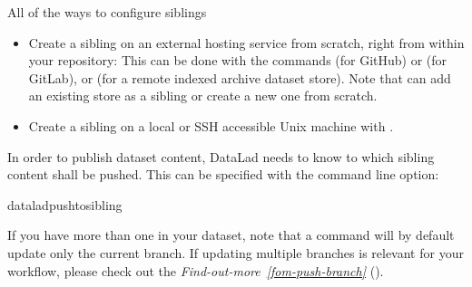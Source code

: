 \begin{findoutmore}[label={fom-all-siblings}, before title={\thetcbcounter\ }, float, floatplacement=tb, check odd page=true]{All of the ways to configure siblings}
\begin{itemize}
\item {} 
\sphinxAtStartPar
Create a sibling on an external hosting service from scratch, right from
within your repository:
This can be done with the commands  (for GitHub)
or  (for GitLab), or
 (for a remote indexed archive dataset store).
Note that  can add an existing store as a sibling
or create a new one from scratch.

\item {} 
\sphinxAtStartPar
Create a sibling on a local or SSH accessible Unix machine with
.

\end{itemize}


\end{findoutmore}

\sphinxAtStartPar
In order to publish dataset content, DataLad needs to know to which sibling
content shall be pushed. This can be specified with the  command line option:

\begin{sphinxVerbatim}[commandchars=\\\{\}]
dataladpush\PYGZhy{}\PYGZhy{}to\PYGZlt{}sibling\PYGZgt{}
\end{sphinxVerbatim}

\sphinxAtStartPar
If you have more than one {\hyperref[\detokenize{glossary:term-branch}]{}} in your dataset, note that a
 command will by default update only the current branch.
If updating multiple branches is relevant for your workflow, please check out
the \textit{Find-out-more}~{\findoutmoreiconinline}\textit{\ref{fom-push-branch}} {\hyperref[\detokenize{basics/101-141-push:fom-push-branch}]{}} ().


